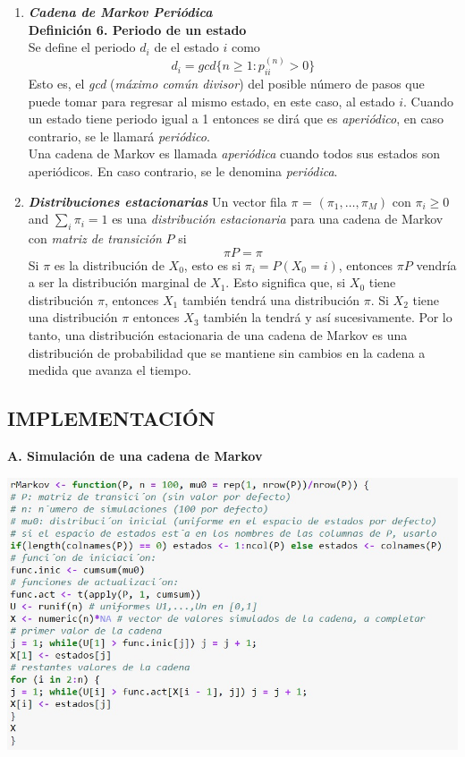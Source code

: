 \documentclass[10pt,a4paper]{article}
\theoremstyle{definition}
\theoremstyle{remark}
\newenvironment{Figure}
  {\par\medskip\noindent\minipage{\linewidth}}
  {\endminipage\par\medskip}
\begin{document}
\begin{multicols}{2}
\begin{enumerate}
\item \textbf{\textit{Cadena de Markov Periódica}}\\

\textbf{Definición 6. Periodo de un estado}\\
Se define el periodo $d_{i}$ de el estado $i$ como
\[
d_{i} = gcd\{n\geq1:p_{ii}^{(n)}>0\}
\]
Esto es, el \textit{gcd} (\textit{máximo común divisor}) del posible número de pasos que puede tomar para regresar al mismo estado, en este caso, al estado $i$. 
Cuando un estado tiene periodo igual a 1 entonces se dirá que es \textit{aperiódico}, en caso contrario, se le llamará \textit{periódico}.\\

Una cadena de Markov es llamada \textit{aperiódica} cuando todos sus estados son aperiódicos. En caso contrario, se le denomina \textit{periódica}.

\item \textbf{\textit{Distribuciones estacionarias}}
Un vector fila $\pi$ = $(\pi_{1},\dots,\pi_{M})$ con $\pi_{i}\geq0$ and $\sum_{i}\pi_{i} = 1$ es una \textit{distribución estacionaria} para una cadena de Markov con \textit{matriz de transición} $P$ si
\[
\pi P = \pi
\]
Si $\pi$ es la distribución de $X_{0}$, esto es si $\pi_{i} = P(X_{0} = i)$, entonces $\pi P$ vendría a ser la distribución marginal de $X_{1}$. Esto significa que, si $X_{0}$ tiene distribución $\pi$, entonces $X_{1}$ también tendrá una distribución $\pi$. Si $X_{2}$ tiene una distribución $\pi$ entonces $X_{3}$ también la tendrá y así sucesivamente.
Por lo tanto, una distribución estacionaria de una cadena de Markov es una distribución de probabilidad que se mantiene sin cambios en la cadena a medida que avanza el tiempo.
\end{enumerate}

\begin{center}
\section{IMPLEMENTACIÓN}
\end{center}
\textbf{A. Simulación de una cadena de Markov}

\begin{Figure}
	\centering
	\includegraphics[scale=0.30]{fun1.jpeg}
	\label{figura1}
\end{Figure}


\end{multicols}
\end{document}
